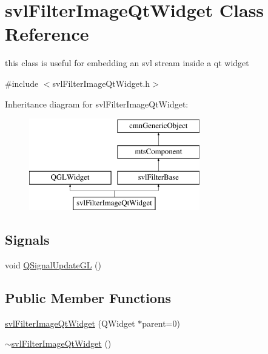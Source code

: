 \hypertarget{classsvl_filter_image_qt_widget}{\section{svl\-Filter\-Image\-Qt\-Widget Class Reference}
\label{classsvl_filter_image_qt_widget}
}


this class is useful for embedding an svl stream inside a qt widget  




{\ttfamily \#include $<$svl\-Filter\-Image\-Qt\-Widget.\-h$>$}

Inheritance diagram for svl\-Filter\-Image\-Qt\-Widget\-:\begin{figure}[H]
\begin{center}
\leavevmode
\includegraphics[height=4.000000cm]{d2/db4/classsvl_filter_image_qt_widget}
\end{center}
\end{figure}
\subsection*{Signals}
\begin{DoxyCompactItemize}
\item 
void \hyperlink{classsvl_filter_image_qt_widget_a438a74443263b3ac8cbfcd568e049aac}{Q\-Signal\-Update\-G\-L} ()
\end{DoxyCompactItemize}
\subsection*{Public Member Functions}
\begin{DoxyCompactItemize}
\item 
\hyperlink{classsvl_filter_image_qt_widget_ab2cfec921bc96d27bc01837ba5e627b0}{svl\-Filter\-Image\-Qt\-Widget} (Q\-Widget $\ast$parent=0)
\item 
\hyperlink{classsvl_filter_image_qt_widget_ad7ac7d4c6f2380c318fb611de4020962}{$\sim$svl\-Filter\-Image\-Qt\-Widget} ()
\end{DoxyCompactItemize}
